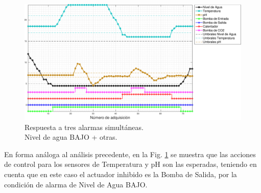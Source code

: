 \begin{figure}[H]
\centering
    \includegraphics[width=\textwidth]{./Figures/plot3waterLow.pdf}
	\caption{Respuesta a tres alarmas simultáneas.\\ Nivel de agua BAJO + otras.}
	\label{fig:alarma3WaterLow}
\end{figure}

En forma análoga al análisis precedente, en la Fig. \ref{fig:alarma3WaterLow} se muestra que las acciones de control para los sensores de Temperatura y pH son las esperadas, teniendo en cuenta que en este caso el actuador inhibido es la Bomba de Salida, por la condición de alarma de Nivel de Agua BAJO.

